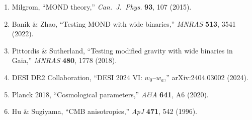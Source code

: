 \documentclass[11pt,a4paper]{article}
\begin{document}
\begin{enumerate}
\item Milgrom, ``MOND theory,'' \textit{Can.\ J.\ Phys.} \textbf{93}, 107 (2015).
\item Banik \& Zhao, ``Testing MOND with wide binaries,'' \textit{MNRAS} \textbf{513}, 3541 (2022).
\item Pittordis \& Sutherland, ``Testing modified gravity with wide binaries in Gaia,'' \textit{MNRAS} \textbf{480}, 1778 (2018).
\item DESI DR2 Collaboration, ``DESI 2024 VI: $w_0$--$w_a$,'' arXiv:2404.03002 (2024).
\item Planck 2018, ``Cosmological parameters,'' \textit{A\&A} \textbf{641}, A6 (2020).
\item Hu \& Sugiyama, ``CMB anisotropies,'' \textit{ApJ} \textbf{471}, 542 (1996).
\end{enumerate}
\end{document}

